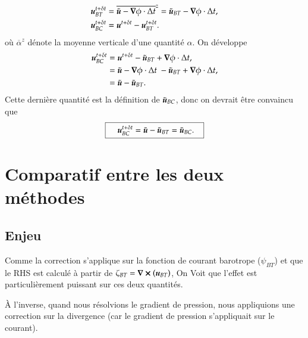 \documentclass[10pt]{article}
\numberwithin{equation}{section}
\newcommand{\uu}{\vb*{u}}
\newcommand{\zmean}[1]{\overline{#1}^z}
\begin{document}
\begin{subequations}
\begin{align}
   & \uu^{t+\delta t}_{BT} = \zmean{\tilde{\uu} - \gradient{\phi} \cdot \Delta t}  = \tilde{\uu}_{BT} - \gradient{\phi} \cdot \Delta t,\\
   & \uu^{t+\delta t}_{BC} = \uu^{t+\delta t} - \uu^{t+\delta t}_{BT}.
\end{align}
\end{subequations}
où \(\zmean{\alpha}\) dénote la moyenne verticale d'une quantité \(\alpha\).
On développe
\begin{align}
   \uu^{t+\delta t}_{BC}
   &= \uu^{t+\delta t} - \tilde{\uu}_{BT} + \gradient{\phi}\cdot \Delta t, \nonumber\\
   &= \tilde{\uu} - \gradient{\phi}\cdot \Delta t\ - \tilde{\uu}_{BT} + \gradient{\phi}\cdot \Delta t, \nonumber\\
   &= \tilde{\uu} - \tilde{\uu}_{BT}.
\end{align}
Cette dernière quantité est la définition de \(\tilde{\uu}_{BC}\), donc on devrait être convaincu que
\begin{equation}
   \boxed{\hspace{0.4cm}\uu^{t+\delta t}_{BC}
   = \tilde{\uu} - \tilde{\uu}_{BT} = \tilde{\uu}_{BC}.\hspace{0.3cm}}
\end{equation}

\section{Comparatif entre les deux méthodes}
\label{sec:org9f0323d}

\subsection{}
\label{sec:orge3a48a7}


\subsection{Enjeu}
\label{sec:org9fac320}
Comme la correction s'applique sur la fonction de courant barotrope (\(\psi_{BT}\)) et que le RHS est calculé à partir de \(\zeta_{BT} = \curl(\uu_{BT})\), On Voit que l'effet est particulièrement puissant sur ces deux quantités.

À l'inverse, quand nous résolvions le gradient de pression, nous appliquions une correction sur la divergence (car le gradient de pression s'appliquait sur le courant).\bigskip
\end{document}
